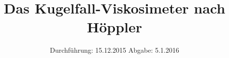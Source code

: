 

\subject{VERSUCH NUMMER 107}
\title{Das Kugelfall-Viskosimeter nach Höppler}
\date{
  Durchführung: 15.12.2015
  \hspace{3em}
  Abgabe:  5.1.2016
}



\maketitle
\thispagestyle{empty}
\tableofcontents
\newpage

%





\printbibliography


